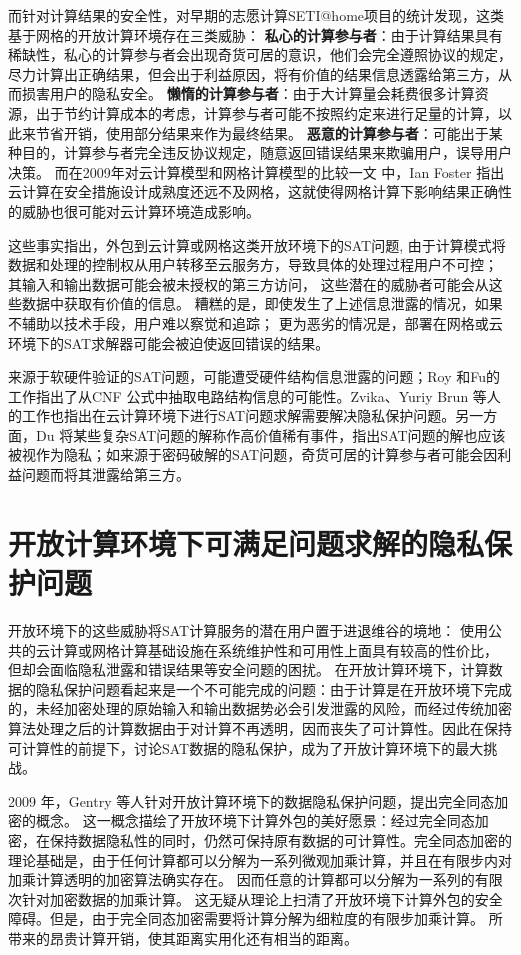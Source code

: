而针对计算结果的安全性，对早期的志愿计算SETI@home项目的统计发现，这类基于网格的开放计算环境存在三类威胁：
\textbf{私心的计算参与者}：由于计算结果具有稀缺性，私心的计算参与者会出现奇货可居的意识，他们会完全遵照协议的规定，尽力计算出正确结果，但会出于利益原因，将有价值的结果信息透露给第三方，从而损害用户的隐私安全。
\textbf{懒惰的计算参与者}：由于大计算量会耗费很多计算资源，出于节约计算成本的考虑，计算参与者可能不按照约定来进行足量的计算，以此来节省开销，使用部分结果来作为最终结果。
\textbf{恶意的计算参与者}：可能出于某种目的，计算参与者完全违反协议规定，随意返回错误结果来欺骗用户，误导用户决策。
而在2009年对云计算模型和网格计算模型的比较一文 中，Ian Foster 指出云计算在安全措施设计成熟度还远不及网格，这就使得网格计算下影响结果正确性的威胁也很可能对云计算环境造成影响。

这些事实指出，外包到云计算或网格这类开放环境下的SAT问题,
由于计算模式将数据和处理的控制权从用户转移至云服务方，导致具体的处理过程用户不可控；
其输入和输出数据可能会被未授权的第三方访问，
这些潜在的威胁者可能会从这些数据中获取有价值的信息。
糟糕的是，即使发生了上述信息泄露的情况，如果不辅助以技术手段，用户难以察觉和追踪；
更为恶劣的情况是，部署在网格或云环境下的SAT求解器可能会被迫使返回错误的结果。

来源于软硬件验证的SAT问题，可能遭受硬件结构信息泄露的问题；Roy 和Fu的工作指出了从CNF 公式中抽取电路结构信息的可能性。Zvika、Yuriy Brun 等人的工作也指出在云计算环境下进行SAT问题求解需要解决隐私保护问题。另一方面，Du 将某些复杂SAT问题的解称作高价值稀有事件，指出SAT问题的解也应该被视作为隐私；如来源于密码破解的SAT问题，奇货可居的计算参与者可能会因利益问题而将其泄露给第三方。

\section{开放计算环境下可满足问题求解的隐私保护问题}
开放环境下的这些威胁将SAT计算服务的潜在用户置于进退维谷的境地：
使用公共的云计算或网格计算基础设施在系统维护性和可用性上面具有较高的性价比，
但却会面临隐私泄露和错误结果等安全问题的困扰。
在开放计算环境下，计算数据的隐私保护问题看起来是一个不可能完成的问题：由于计算是在开放环境下完成的，未经加密处理的原始输入和输出数据势必会引发泄露的风险，而经过传统加密算法处理之后的计算数据由于对计算不再透明，因而丧失了可计算性。因此在保持可计算性的前提下，讨论SAT数据的隐私保护，成为了开放计算环境下的最大挑战。

2009 年，Gentry 等人针对开放计算环境下的数据隐私保护问题，提出完全同态加密的概念。
这一概念描绘了开放环境下计算外包的美好愿景：经过完全同态加密，在保持数据隐私性的同时，仍然可保持原有数据的可计算性。完全同态加密的理论基础是，由于任何计算都可以分解为一系列微观加乘计算，并且在有限步内对加乘计算透明的加密算法确实存在。
因而任意的计算都可以分解为一系列的有限次针对加密数据的加乘计算。
这无疑从理论上扫清了开放环境下计算外包的安全障碍。但是，由于完全同态加密需要将计算分解为细粒度的有限步加乘计算。
所带来的昂贵计算开销，使其距离实用化还有相当的距离。

